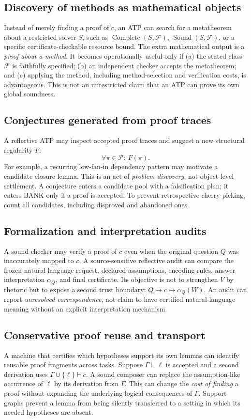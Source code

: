 \documentclass[11pt,letterpaper]{article}
\begin{document}
\subsection{Discovery of methods as mathematical objects}
Instead of merely finding a proof of $c$, an ATP can search for a metatheorem about a restricted solver $S$, such as $\operatorname{Complete}(S,\mathcal F)$, $\operatorname{Sound}(S,\mathcal F)$, or a specific certificate-checkable resource bound. The extra mathematical output is a \emph{proof about a method}. It becomes operationally useful only if (a) the stated class $\mathcal F$ is faithfully specified; (b) an independent checker accepts the metatheorem; and (c) applying the method, including method-selection and verification costs, is advantageous. This is not an unrestricted claim that an ATP can prove its own global soundness.

\subsection{Conjectures generated from proof traces}
A reflective ATP may inspect accepted proof traces and suggest a new structural regularity $F$:
\[
\forall\pi\in\mathcal P:\ F(\pi).
\]
For example, a recurring low-fan-in dependency pattern may motivate a candidate closure lemma. This is an act of \emph{problem discovery}, not object-level settlement. A conjecture enters a candidate pool with a falsification plan; it enters BANK only if a proof is accepted. To prevent retrospective cherry-picking, count all candidates, including disproved and abandoned ones.

\subsection{Formalization and interpretation audits}
A sound checker may verify a proof of $c$ even when the original question $Q$ was inaccurately mapped to $c$. A source-sensitive reflective audit can compare the frozen natural-language request, declared assumptions, encoding rules, answer interpretation $\alpha_Q$, and final certificate. Its objective is not to strengthen $V$ by rhetoric but to expose a second trust boundary: $Q\mapsto c\mapsto\alpha_Q(W)$. An audit can report \emph{unresolved correspondence}, not claim to have certified natural-language meaning without an explicit interpretation mechanism.

\subsection{Conservative proof reuse and transport}
A machine that certifies which hypotheses support its own lemmas can identify reusable proof fragments across tasks. Suppose $\Gamma\vdash\ell$ is accepted and a second derivation uses $\Gamma\cup\{\ell\}\vdash c$. A sound composer can replace the assumption-like occurrence of $\ell$ by its derivation from $\Gamma$. This can change the \emph{cost of finding} a proof without expanding the underlying logical consequences of $\Gamma$. Support graphs prevent a lemma from being silently transferred to a setting in which its needed hypotheses are absent.
\end{document}
